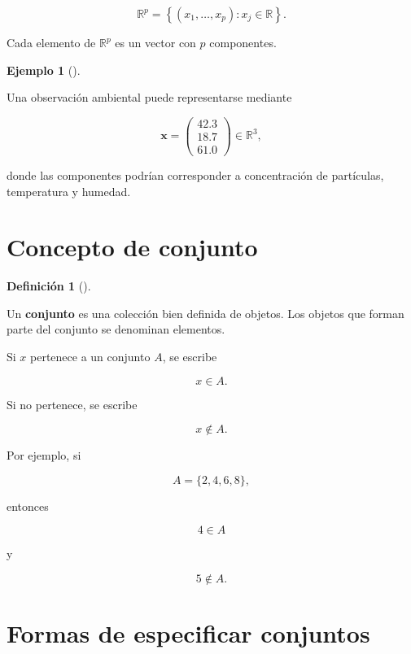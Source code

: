 \documentclass[
  spanish,
  10.5pt,
  letterpaper,
  DIV=11,
  numbers=noendperiod,
  oneside,
  open=any]{scrreprt}
\theoremstyle{definition}
\newtheorem{definition}{Definición}[chapter]
\theoremstyle{definition}
\newtheorem{example}{Ejemplo}[chapter]
\theoremstyle{plain}
\theoremstyle{remark}
\begin{document}
\[
\mathbb{R}^{p}
=
\left\{
(x_1,\ldots,x_p):x_j\in\mathbb{R}
\right\}.
\]

Cada elemento de \(\mathbb{R}^{p}\) es un vector con \(p\) componentes.

\begin{example}[]\protect\hypertarget{exm-vector-caracteristicas}{}\label{exm-vector-caracteristicas}

Una observación ambiental puede representarse mediante

\[
\mathbf{x}
=
\begin{pmatrix}
42.3\\
18.7\\
61.0
\end{pmatrix}
\in\mathbb{R}^{3},
\]

donde las componentes podrían corresponder a concentración de
partículas, temperatura y humedad.

\end{example}

\section*{Concepto de conjunto}\label{concepto-de-conjunto}


\begin{definition}[]\protect\hypertarget{def-conjunto}{}\label{def-conjunto}

Un \textbf{conjunto} es una colección bien definida de objetos. Los
objetos que forman parte del conjunto se denominan elementos.

\end{definition}

Si \(x\) pertenece a un conjunto \(A\), se escribe

\[
x\in A.
\]

Si no pertenece, se escribe

\[
x\notin A.
\]

Por ejemplo, si

\[
A=\{2,4,6,8\},
\]

entonces

\[
4\in A
\]

y

\[
5\notin A.
\]

\section*{Formas de especificar
conjuntos}\label{formas-de-especificar-conjuntos}
\end{document}
